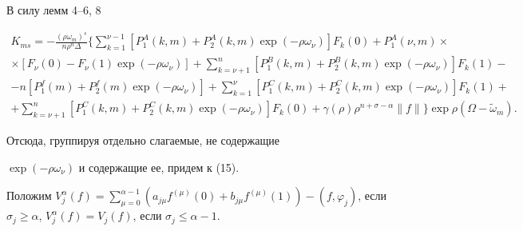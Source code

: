 \begin{pf}


В силу лемм 4--6, 8


\begin{multline*}


K_{ms}=- \frac {(\rho\omega_m)^s}{n\rho^n\Delta}


\bigg\{\sum\limits_{k=1}^{\nu-1}[P_1^A(k,m)+P_2^A(k,m)\exp(-\rho


\omega_\nu)]F_k(0)+P_1^A(\nu,m)\times \\


%


\times[F_\nu(0)-F_\nu(1)\exp(-\rho\omega_\nu)]+\sum\limits_


{k=\nu+1}^n[P_1^B(k,m)+P_2^B(k,m)\exp(-\rho\omega_\nu)]F_k(1)- \\


%


-n[P_1^f(m)+P_2^f(m)\exp(-\rho\omega_\nu)]+\sum\limits


_{k=1}^{\nu}[P_1^C(k,m)+P_2^C(k,m)\exp(-\rho\omega_\nu)]F_k(1)+ \\


%


+\sum\limits_{k=\nu+1}^n[P_1^C(k,m)+P_2^C(k,m)\exp(-\rho\omega_\nu)]


F_k(0)+


\gamma(\rho)\rho^{n+\sigma-\alpha}\|f\|\bigg\}\exp\rho


(\Omega-\widetilde\omega_m).


\end{multline*}


Отсюда, группируя отдельно слагаемые, не содержащие


$\exp(-\rho\omega_\nu)$ и содержащие ее, придем к (15).


\end{pf}





Положим $V_j^\alpha(f)=\sum\limits_{\mu=0}^{\alpha-1}(a_{j\mu}


f^{(\mu)}(0)+b_{j\mu}f^{(\mu)}(1))-(f,\varphi_j)$, если $\sigma


_j\ge\alpha$, $V_j^\alpha(f)=V_j(f)$, если $\sigma_j\le\alpha-1$.






